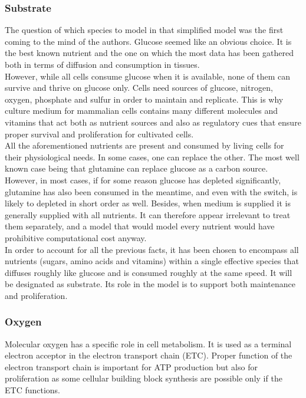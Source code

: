 \documentclass[11pt,a4paper]{article}
\begin{document}
\subsubsection{Substrate}
The question of which species to model in that simplified model was the first coming to the mind of the authors. Glucose seemed like an obvious choice. It is the best known nutrient and the one on which the most data has been gathered both in terms of diffusion and consumption in tissues.\\

However, while all cells consume glucose when it is available, none of them can survive and thrive on glucose only. Cells need sources of glucose, nitrogen, oxygen, phosphate and sulfur in order to maintain and replicate. This is why culture medium for mammalian cells contains many different molecules and vitamins that act both as nutrient sources and also as regulatory cues that ensure proper survival and proliferation for cultivated cells.\\

All the aforementioned nutrients are present and consumed by living cells for their physiological needs. In some cases, one can replace the other. The most well known case being that glutamine can replace glucose as a carbon source.\cite{Stuart2023}\cite{Mazurek1997} However, in most cases, if for some reason glucose has depleted significantly, glutamine has also been consumed in the meantime, and even with the switch, is likely to depleted in short order as well. Besides, when medium is supplied it is generally supplied with all nutrients. It can therefore appear irrelevant to treat them separately, and a model that would model every nutrient would have prohibitive computational cost anyway.\\

In order to account for all the previous facts, it has been chosen to encompass all nutrients (sugars, amino acids and vitamins) within a single effective species that diffuses roughly like glucose and is consumed roughly at the same speed. It will be designated as substrate. Its role in the model is to support both maintenance and proliferation.\\

\subsubsection{Oxygen}
Molecular oxygen has a specific role in cell metabolism. It is used as a terminal electron acceptor in the electron transport chain (ETC). Proper function of the electron transport chain is important for ATP production but also for proliferation as some cellular building block synthesis are possible only if the ETC functions.\cite{Martinez2020}\\
\end{document}
